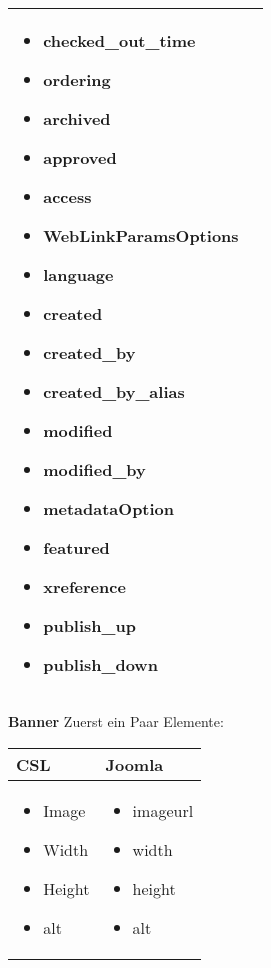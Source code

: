 \begin{minipage}{0.7\textwidth}
\begin{tabular}{|p{} | p{}|}
\begin{itemize}
\item   checked\_out\_time
\item   ordering
\item   archived
\item   approved
\item   access
\item   WebLinkParamsOptions
\item   language
\item   created
\item   created\_by
\item   created\_by\_alias
\item   modified
\item   modified\_by
\item   metadataOption
\item   featured
\item   xreference
\item   publish\_up
\item   publish\_down 
\end{itemize}
\\
\hline
\end{tabular}
\end{minipage}

\textbf{Banner}
Zuerst ein Paar Elemente:

\begin{minipage}{0.7\textwidth}
\begin{tabular}{|p{} | p{}|}
\hline
\textbf{CSL} & \textbf{Joomla} \\ 
\hline
\begin{itemize}
\item Image
\item Width
\item Height
\item alt
\end{itemize}
 & 
\begin{itemize}
\item imageurl
\item width
\item height
\item alt
\end{itemize}
\\
\hline
\end{tabular}
\end{minipage}

